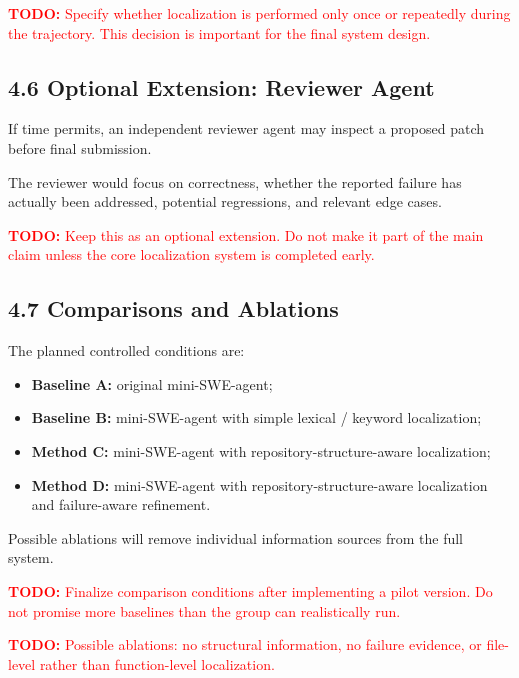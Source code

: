 \documentclass[11pt]{article}
\newcommand{\todo}[1]{%
    \textcolor{red}{\textbf{TODO:} #1}%
}
\begin{document}
\todo{Specify whether localization is performed only once or repeatedly
during the trajectory. This decision is important for the final system
design.}


\subsection*{4.6 Optional Extension: Reviewer Agent}

If time permits, an independent reviewer agent may inspect a proposed
patch before final submission.

The reviewer would focus on correctness, whether the reported failure
has actually been addressed, potential regressions, and relevant edge
cases.

\todo{Keep this as an optional extension. Do not make it part of the main
claim unless the core localization system is completed early.}


\subsection*{4.7 Comparisons and Ablations}

The planned controlled conditions are:

\begin{itemize}[leftmargin=*, itemsep=0.25em]

    \item \textbf{Baseline A:}
    original mini-SWE-agent;

    \item \textbf{Baseline B:}
    mini-SWE-agent with simple lexical / keyword localization;

    \item \textbf{Method C:}
    mini-SWE-agent with repository-structure-aware localization;

    \item \textbf{Method D:}
    mini-SWE-agent with repository-structure-aware localization and
    failure-aware refinement.

\end{itemize}

Possible ablations will remove individual information sources from the
full system.

\todo{Finalize comparison conditions after implementing a pilot version.
Do not promise more baselines than the group can realistically run.}

\todo{Possible ablations: no structural information, no failure evidence,
or file-level rather than function-level localization.}
\end{document}
